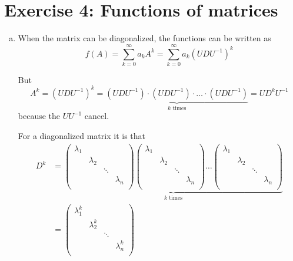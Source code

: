 \documentclass[a4paper,german,12pt,smallheadings]{scrartcl}
\begin{document}
\section*{Exercise 4: Functions of matrices}
\begin{enumerate}[a)]
  \item
    When the matrix can be diagonalized, the functions can be written as
    \begin{equation*}
      f(A)
      = \sum_{k=0}^{\infty} a_k A^k 
      = \sum_{k=0}^{\infty} a_k (UDU^{-1})^k
    \end{equation*}

    But
    \begin{equation*}
      A^k = (UDU^{-1})^k
      = \underbrace{(UDU^{-1})\cdot(UDU^{-1})\cdot\dots\cdot(UDU^{-1})}_{k\text{ times}} 
      = U D^k U^{-1}
    \end{equation*}
    because the $UU^{-1}$ cancel.

    For a diagonalized matrix it is that
    \begin{align*}
      D^k &= 
      \underbrace{
        \begin{pmatrix} 
          \lambda_1 &  &  \\
           & \lambda_2 & &  \\
           & & \ddots &  \\
           &&& \lambda_n \\
        \end{pmatrix}
        \begin{pmatrix} 
          \lambda_1 &  &  \\
           & \lambda_2 & &  \\
           & & \ddots &  \\
           &&& \lambda_n \\
        \end{pmatrix}
        \dots
        \begin{pmatrix} 
          \lambda_1 &  &  \\
           & \lambda_2 & &  \\
           & & \ddots &  \\
           &&& \lambda_n \\
        \end{pmatrix}
      }_{k\text{ times}} \\
      &=
      \begin{pmatrix} 
        \lambda_1^k &  &  \\
         & \lambda_2^k & &  \\
         & & \ddots &  \\
         &&& \lambda_n^k \\
      \end{pmatrix}
    \end{align*}


\end{enumerate}
\end{document}
